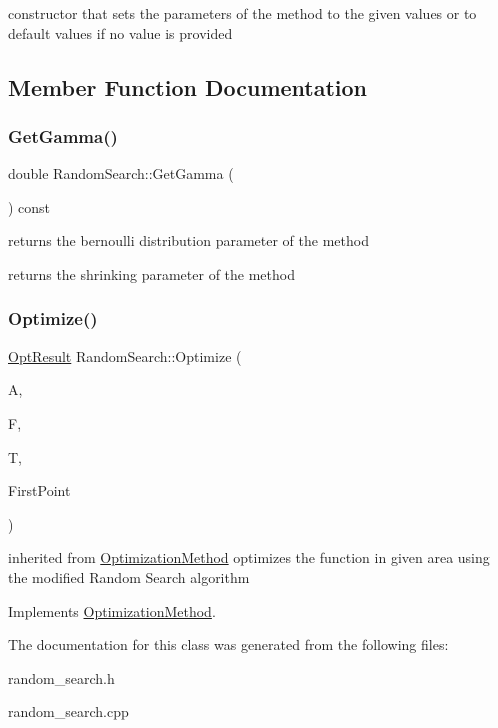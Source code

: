 constructor that sets the parameters of the method to the given values or to default values if no value is provided 

\subsection{Member Function Documentation}
\mbox{\label{class_random_search_a4009e36c2e604791a3f050280262fcc6}} 
\subsubsection{\texorpdfstring{Get\+Gamma()}{GetGamma()}}
{\footnotesize\ttfamily double Random\+Search\+::\+Get\+Gamma (\begin{DoxyParamCaption}{ }\end{DoxyParamCaption}) const\hspace{0.3cm}{\ttfamily [inline]}}



returns the bernoulli distribution parameter of the method 

returns the shrinking parameter of the method \mbox{\label{class_random_search_a869069d90b1c12ec67182f415be7e8ce}} 
\subsubsection{\texorpdfstring{Optimize()}{Optimize()}}
{\footnotesize\ttfamily \hyperlink{struct_opt_result}{Opt\+Result} Random\+Search\+::\+Optimize (\begin{DoxyParamCaption}\item[{std\+::shared\+\_\+ptr$<$ \hyperlink{class_area}{Area} $>$}]{A,  }\item[{std\+::shared\+\_\+ptr$<$ \hyperlink{class_function}{Function} $>$}]{F,  }\item[{std\+::shared\+\_\+ptr$<$ \hyperlink{class_terminal_condition}{Terminal\+Condition} $>$}]{T,  }\item[{const \hyperlink{classv_point}{v\+Point} \&}]{First\+Point }\end{DoxyParamCaption})\hspace{0.3cm}{\ttfamily [virtual]}}

inherited from \hyperlink{class_optimization_method}{Optimization\+Method} optimizes the function in given area using the modified Random Search algorithm 

Implements \hyperlink{class_optimization_method_a98a1e917667c3ca851cbcd9068b0a9d9}{Optimization\+Method}.



The documentation for this class was generated from the following files\+:\begin{DoxyCompactItemize}
\item 
random\+\_\+search.\+h\item 
random\+\_\+search.\+cpp\end{DoxyCompactItemize}
